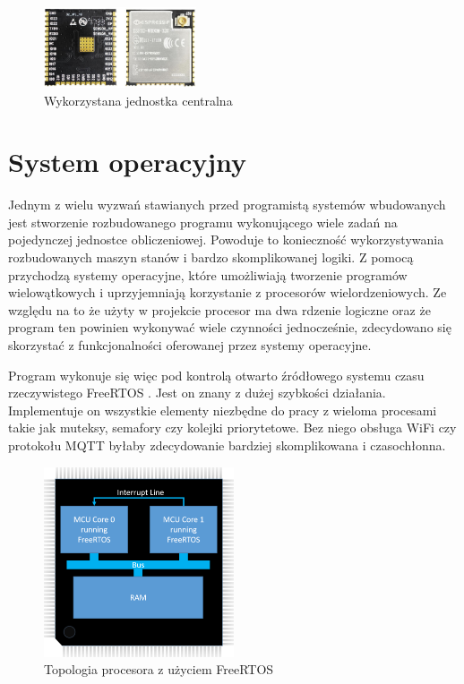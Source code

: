     
            \begin{figure}[ht]
              \centering
              \includegraphics[width=0.4\textwidth]{img/esp32.jpg}
              \caption{Wykorzystana jednostka centralna \cite{esp_fig}}
              \label{esp}
            \end{figure}
    
    
        \section{System operacyjny}
            Jednym z wielu wyzwań stawianych przed programistą systemów wbudowanych jest stworzenie rozbudowanego programu wykonującego wiele zadań na pojedynczej jednostce obliczeniowej. Powoduje to konieczność wykorzystywania rozbudowanych maszyn stanów i bardzo skomplikowanej logiki. Z pomocą przychodzą systemy operacyjne, które umożliwiają tworzenie programów wielowątkowych i uprzyjemniają korzystanie z procesorów wielordzeniowych. Ze względu na to że użyty w projekcie procesor ma dwa rdzenie logiczne oraz że program ten powinien wykonywać wiele czynności jednocześnie, zdecydowano się skorzystać z funkcjonalności oferowanej przez systemy operacyjne. 
            
            Program wykonuje się więc pod kontrolą otwarto źródłowego systemu czasu rzeczywistego FreeRTOS \cite{freertos}. Jest on znany z dużej szybkości działania. Implementuje on wszystkie elementy niezbędne do pracy z wieloma procesami takie jak muteksy, semafory czy kolejki priorytetowe. Bez niego obsługa WiFi czy protokołu MQTT byłaby zdecydowanie bardziej skomplikowana i czasochłonna. 
            
            \vspace{1em}
            
            \begin{figure}[ht]
              \centering
              \includegraphics[width=0.5\textwidth]{img/multicore_amp_hardware_configuration.png}
              \caption{Topologia procesora z użyciem FreeRTOS \cite{freertos_fig}}
              \label{freertos}
            \end{figure}
            
